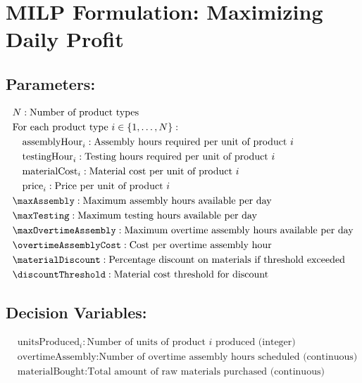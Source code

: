 \documentclass{article}
\begin{document}
\section*{MILP Formulation: Maximizing Daily Profit}

\subsection*{Parameters:}
\begin{align*}
    &N : \text{Number of product types} \\
    &\text{For each product type } i \in \{1, \ldots, N\}: \\
    &\quad \text{assemblyHour}_i : \text{Assembly hours required per unit of product } i \\
    &\quad \text{testingHour}_i : \text{Testing hours required per unit of product } i \\
    &\quad \text{materialCost}_i : \text{Material cost per unit of product } i \\
    &\quad \text{price}_i : \text{Price per unit of product } i \\
    &\maxAssembly : \text{Maximum assembly hours available per day} \\
    &\maxTesting : \text{Maximum testing hours available per day} \\
    &\maxOvertimeAssembly : \text{Maximum overtime assembly hours available per day} \\
    &\overtimeAssemblyCost : \text{Cost per overtime assembly hour} \\
    &\materialDiscount : \text{Percentage discount on materials if threshold exceeded} \\
    &\discountThreshold : \text{Material cost threshold for discount} \\
\end{align*}

\subsection*{Decision Variables:}
\begin{align*}
    &\text{unitsProduced}_i : \text{Number of units of product } i \text{ produced (integer)} \\
    &\text{overtimeAssembly} : \text{Number of overtime assembly hours scheduled (continuous)} \\
    &\text{materialBought} : \text{Total amount of raw materials purchased (continuous)} \\
\end{align*}
\end{document}
